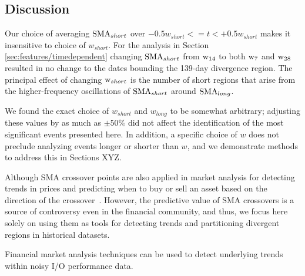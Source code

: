 \subsection {Discussion}
\label{sec:results/discussion}


Our choice of averaging $\textup{SMA}_{short}$ over ${-0.5w_{short} <= t < +0.5w_{short}}$ makes it insensitive to choice of $w_{short}$.
For the analysis in Section \ref{sec:features/timedependent} changing $\textup{SMA}_{short}$ from $\textup{w}_{14}$ to both $\textup{w}_{7}$ and $\textup{w}_{28}$ resulted in no change to the dates bounding the 139-day divergence region.
The principal effect of changing $\textup{w}_{short}$ is the number of short regions that arise from the higher-frequency oscillations of $\textup{SMA}_{short}$ around $\textup{SMA}_{long}$.


We found the exact choice of $w_{short}$ and $w_{long}$ to be somewhat arbitrary; adjusting these values by as much as $\pm 50\%$ did not affect the identification of the most significant events presented here.
In addition, a specific choice of $w$ does not preclude analyzing events longer or shorter than $w$, and we demonstrate methods to address this in Sections XYZ.

Although SMA crossover points are also applied in market analysis for detecting trends in prices and predicting when to buy or sell an asset based on the direction of the crossover~\cite{brock1992simple}.
However, the predictive value of SMA crossovers is a source of controversy even in the financial community, and thus, we focus here solely on using them as tools for detecting trends and partitioning divergent regions in historical datasets.

Financial market analysis techniques can be used to detect underlying trends within noisy I/O performance data.